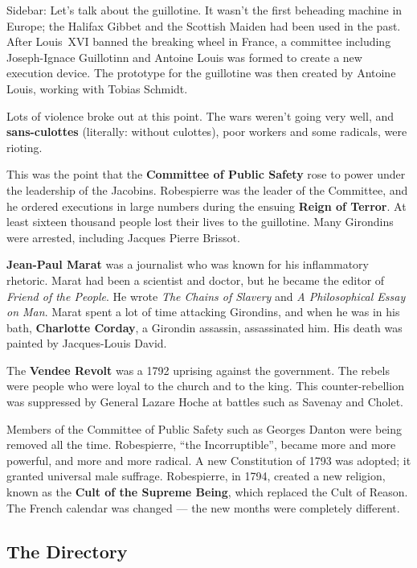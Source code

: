 Sidebar: Let's talk about the guillotine.
It wasn't the first beheading machine in Europe;
the Halifax Gibbet and the Scottish Maiden had been used in the past.
After Louis~XVI banned the breaking wheel in France,
a committee including Joseph-Ignace Guillotinn and Antoine Louis
was formed to create a new execution device.
The prototype for the guillotine was then created by Antoine Louis, working with Tobias Schmidt.

Lots of violence broke out at this point.
The wars weren't going very well, and \textbf{sans-culottes} (literally: without culottes),
poor workers and some radicals, were rioting.

This was the point that the \textbf{Committee of Public Safety}
rose to power under the leadership of the Jacobins.
Robespierre was the leader of the Committee,
and he ordered executions in large numbers during the ensuing \textbf{Reign of Terror}.
At least sixteen thousand people lost their lives to the guillotine.
Many Girondins were arrested, including Jacques Pierre Brissot.

\textbf{Jean-Paul Marat} was a journalist who was known for his inflammatory rhetoric.
Marat had been a scientist and doctor, but he became the editor of \textit{Friend of the People}.
He wrote \textit{The Chains of Slavery} and \textit{A Philosophical Essay on Man}.
Marat spent a lot of time attacking Girondins, and when he was in his bath,
\textbf{Charlotte Corday}, a Girondin assassin, assassinated him.
His death was painted by Jacques-Louis David.

The \textbf{Vendee Revolt} was a 1792 uprising against the government.
The rebels were people who were loyal to the church and to the king.
This counter-rebellion was suppressed by General Lazare Hoche at battles such as Savenay and Cholet.

Members of the Committee of Public Safety such as Georges Danton were being removed all the time.
Robespierre, ``the Incorruptible'', became more and more powerful, and more and more radical.
A new Constitution of 1793 was adopted; it granted universal male suffrage.
Robespierre, in 1794, created a new religion, known as the \textbf{Cult of the Supreme Being},
which replaced the Cult of Reason.
The French calendar was changed --- the new months were completely different.

\subsection*{The Directory}

